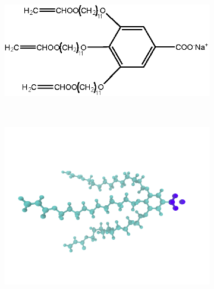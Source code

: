 \documentclass[journal=jpcbfk,manuscript=article]{achemso}
\begin{document}
  \begin{figure}
	\centering
	\begin{subfigure}{.3\textwidth}
		\centering
		\includegraphics[width=\textwidth]{NaGA3C11.eps}
		\caption{}~\label{fig:monomer}
	\end{subfigure}
	\begin{subfigure}{.3\textwidth}
		\centering
		\includegraphics[width=\textwidth]{monomer_twocolor.pdf}
		\caption{}~\label{fig:atomistic_monomer}
	\end{subfigure}
	\begin{subfigure}{0.3\linewidth}
		\centering

\end{subfigure}
\end{figure}
\end{document}
